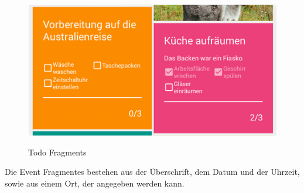 \begin{figure}[H]
\centering
\begin{minipage}[t]{1\textwidth} %
\caption{Todo Fragments} %
\includegraphics[width=1\textwidth]{img/FragmentT}\\ %
\end{minipage}
\end{figure}

Die Event Fragmentes bestehen aus der Überschrift, dem Datum und der Uhrzeit, sowie aus einem Ort, der angegeben werden kann.

